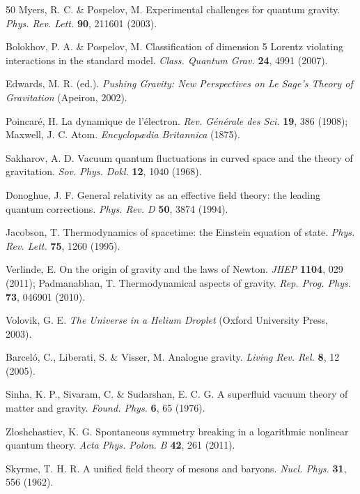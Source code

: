 \documentclass[11pt,a4paper]{article}
\begin{document}
\begin{thebibliography}{50}
 Myers, R. C. \& Pospelov, M. Experimental challenges for quantum gravity.
\emph{Phys. Rev. Lett.} \textbf{90}, 211601 (2003).

 Bolokhov, P. A. \& Pospelov, M. Classification of dimension 5 Lorentz
violating interactions in the standard model. \emph{Class. Quantum Grav.} \textbf{24}, 4991
(2007).

 Edwards, M. R. (ed.). \emph{Pushing Gravity: New Perspectives on Le Sage's
Theory of Gravitation} (Apeiron, 2002).

 Poincar\'e, H. La dynamique de l'\'electron. \emph{Rev. G\'en\'erale des
Sci.} \textbf{19}, 386 (1908); Maxwell, J. C. Atom. \emph{Encyclop\ae dia Britannica} (1875).

 Sakharov, A. D. Vacuum quantum fluctuations in curved space and the
theory of gravitation. \emph{Sov. Phys. Dokl.} \textbf{12}, 1040 (1968).

 Donoghue, J. F. General relativity as an effective field theory: the
leading quantum corrections. \emph{Phys. Rev. D} \textbf{50}, 3874 (1994).

 Jacobson, T. Thermodynamics of spacetime: the Einstein equation of state.
\emph{Phys. Rev. Lett.} \textbf{75}, 1260 (1995).

 Verlinde, E. On the origin of gravity and the laws of Newton.
\emph{JHEP} \textbf{1104}, 029 (2011); Padmanabhan, T. Thermodynamical aspects of gravity.
\emph{Rep. Prog. Phys.} \textbf{73}, 046901 (2010).

 Volovik, G. E. \emph{The Universe in a Helium Droplet} (Oxford University
Press, 2003).

 Barcel\'o, C., Liberati, S. \& Visser, M. Analogue gravity.
\emph{Living Rev. Rel.} \textbf{8}, 12 (2005).

 Sinha, K. P., Sivaram, C. \& Sudarshan, E. C. G. A superfluid vacuum theory of
matter and gravity. \emph{Found. Phys.} \textbf{6}, 65 (1976).

 Zloshchastiev, K. G. Spontaneous symmetry breaking in a logarithmic
nonlinear quantum theory. \emph{Acta Phys. Polon. B} \textbf{42}, 261 (2011).

 Skyrme, T. H. R. A unified field theory of mesons and baryons.
\emph{Nucl. Phys.} \textbf{31}, 556 (1962).


\end{thebibliography}
\end{document}
